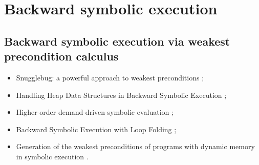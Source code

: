 \section*{Backward symbolic execution}

\subsection*{Backward symbolic execution via weakest precondition calculus}
\begin{itemize}

\item Snugglebug: a powerful approach to weakest preconditions \cite{chandra2009bsewpc};

\item Handling Heap Data Structures in Backward Symbolic Execution \cite{husak2020bsewpc};

\item Higher-order demand-driven symbolic evaluation \cite{zachary2020bsewpc};

\item Backward Symbolic Execution with Loop Folding \cite{chalupa2021bsewpc};

\item Generation of the weakest preconditions of programs with dynamic memory in symbolic execution \cite{misonizhnik2022bsewpc}.

\end{itemize}
